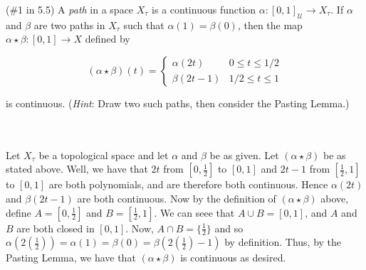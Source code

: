 (\#1 in 5.5) A \textit{path} in a space $X_{\tau}$ is a continuous function
$\alpha:[0,1]_{\mathcal{U}}\to X_{\tau}$. If $\alpha$ and $\beta$ are two paths in $X_{\tau}$ such that
$\alpha(1) = \beta(0)$, then the map $\alpha \star \beta:[0,1]\to X$ defined by

\[(\alpha \star \beta)(t)=\left\{ \begin{array}{ll}
                                    \alpha(2t) & \mbox{$0\leq t\leq 1/2$}\\
                                    \beta(2t-1)      & \mbox{$1/2 \leq t\leq 1$}
                                    \end{array}
                          \right. \]

 is continuous. (\textit{Hint}: Draw two such paths, then consider the Pasting Lemma.)\\\\

\begin{solution}\renewcommand{\qedsymbol}{}\ \\
    Let $X_{\tau}$ be a topological space and let $\alpha$ and $\beta$ be as given. Let
    $(\alpha\star\beta)$ be as stated above. Well, we have that $2t$ from $[0,\frac12]$ to $[0,1]$ and
    $2t-1$ from $[\frac12,1]$ to $[0,1]$ are both polynomials, and are therefore both continuous. Hence
    $\alpha(2t)$ and $\beta(2t-1)$ are both continuous. Now by the definition of $(\alpha\star\beta)$
    above, define $A=[0,\frac12]$ and $B=[\frac12,1]$. We can seee that $A\cup B=[0,1]$, and $A$ and $B$
    are both closed in $[0,1]$. Now, $A\cap B=\{\frac12\}$ and so
    $\alpha(2(\frac12))=\alpha(1)=\beta(0)=\beta(2(\frac12)-1)$ by definition. Thus, by the Pasting
    Lemma, we have that $(\alpha\star\beta)$ is continuous as desired.\\

\end{solution}